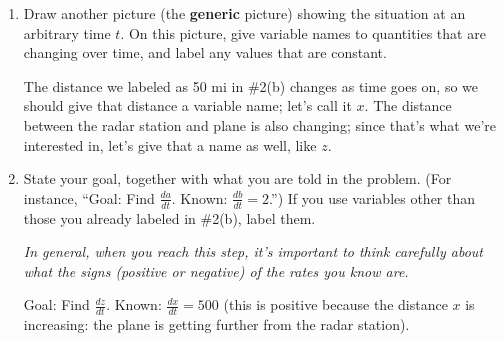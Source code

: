 \documentclass{article}
\begin{document}
\begin{enumerate}
{\begin{enumerate}
    \item
\begin{problem}
        Draw another picture (the \textbf{generic} picture) showing the
        situation at an arbitrary time $t$.  On this picture, give
        variable names to quantities that are changing over time, and
        label any values that are constant.
      \end{problem}
      \pspace{\vfill}

      \begin{solution}
        The distance we labeled as 50 mi in
        {{{{\#2}}(b)}} changes as time goes
        on, so we should give that distance a variable name; let's call it
        $x$.  The distance between the radar station and plane is also
        changing; since that's what we're interested in, let's give that a
        name as well, like $z$.
        \begin{center}
        \end{center}        
      \end{solution}

    \item
      \begin{problem}
        State your goal, together with what you are told in the problem.
        (For instance, ``Goal: Find $\frac{da}{dt}$.  Known: $\frac{db}{dt}
        = 2$.'')  If you use variables other than those you already labeled
        in {{{{\#2}}(b)}}, label them.

        \emph{In general, when you reach this step, it's important to think
          carefully about what the signs (positive or negative) of the rates
          you know are.}
      \end{problem}
      \pspace{\vfill}

      \begin{solution}
        Goal: Find $\frac{dz}{dt}$.  Known: $\frac{dx}{dt} = 500$ (this is
        positive because the distance $x$ is increasing: the plane is
        getting further from the radar station). 
      \end{solution}


\end{enumerate}}
\end{enumerate}
\end{document}
